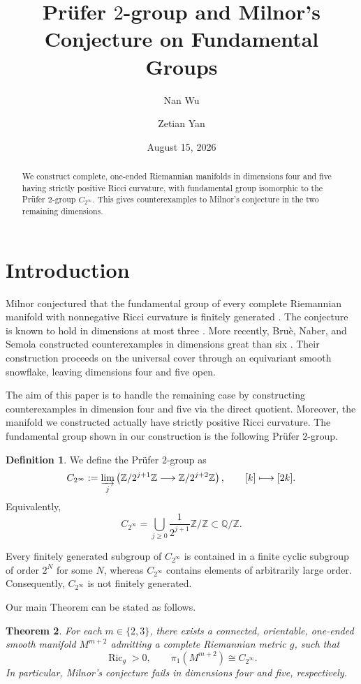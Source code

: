 \documentclass[11pt,reqno]{amsart}
\title[Counterexamples to Milnor's Conjecture]
{Pr\"ufer $2$-group and Milnor's Conjecture on Fundamental Groups}
\author[N. Wu]{Nan Wu}
\author[Z. Yan]{Zetian Yan}
\date{August 15, 2026}
\newtheorem{theorem}{Theorem}[section]
\theoremstyle{definition}
\newtheorem{definition}[theorem]{Definition}
\numberwithin{equation}{section}
\DeclareMathOperator{\Ric}{Ric}
\newcommand{\CPrufer}{C_{2^\infty}}
\begin{document}
\raggedbottom

\begin{abstract}
We construct complete, one-ended Riemannian manifolds in dimensions four
and five having strictly positive Ricci curvature, with fundamental group
isomorphic to the Pr\"ufer $2$-group $C_{2^\infty}$. This gives counterexamples
to Milnor's conjecture in the two remaining dimensions. 
\end{abstract}

\maketitle
\tableofcontents
\enlargethispage{4pt}



\section{Introduction}
\label{sec:statement}
Milnor conjectured that the fundamental group of every complete
Riemannian manifold with nonnegative Ricci curvature is finitely
generated \cite{Milnor1968}.  The conjecture is known to hold in
dimensions at most three
\cite{CohnVossen1935,Liu2013,Pan2020}.  More recently, Bru\`e, Naber,
and Semola constructed counterexamples in dimensions great than six 
\cite{BNS7,BNS6}.  Their construction proceeds on the universal cover
through an equivariant smooth snowflake, leaving dimensions four and
five open.

The aim of this paper is to handle the remaining case by constructing counterexamples
in dimension four and five via the direct quotient.  Moreover, the manifold we constructed actually have strictly positive Ricci
curvature. The fundamental group shown in our construction is the following Pr\"ufer $2$-group.
\begin{definition}
We define the Pr\"ufer $2$-group as
\[
 \CPrufer
 :=\varinjlim_j
 \left(
 \mathbb Z/2^{j+1}\mathbb Z
 \longrightarrow
 \mathbb Z/2^{j+2}\mathbb Z
 \right),
 \qquad
 [k]\longmapsto[2k].
\]
Equivalently,
\[
 \CPrufer
 =
 \bigcup_{j\ge0}
 \frac{1}{2^{j+1}}\mathbb Z\big/\mathbb Z
 \subset \mathbb Q/\mathbb Z.
\]
\end{definition}
Every finitely generated subgroup of $\CPrufer$ is contained in a finite
cyclic subgroup of order $2^N$ for some $N$, whereas $\CPrufer$ contains
elements of arbitrarily large order.  Consequently, $\CPrufer$ is not
finitely generated.

Our main Theorem can be stated as follows.
\begin{theorem}\label{thm:main}
For each $m\in\{2,3\}$, there exists a connected, orientable, one-ended
smooth manifold $M^{m+2}$ admitting a complete Riemannian metric $g$, such
that
\[
 \Ric_g>0,
 \qquad
 \pi_1(M^{m+2})\cong\CPrufer.
\]
In particular, Milnor's conjecture fails in dimensions four and five, respectively.
\end{theorem}
\end{document}
